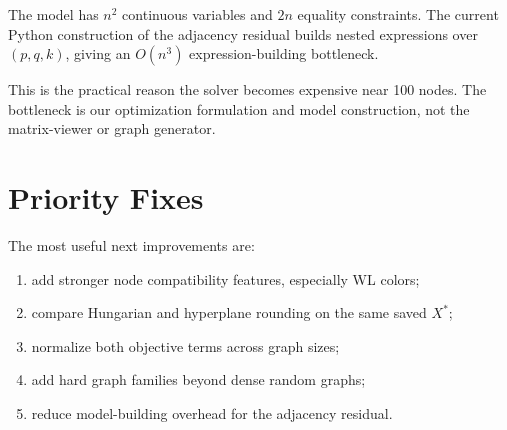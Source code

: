 \documentclass[11pt]{article}
\begin{document}
The model has $n^2$ continuous variables and $2n$ equality constraints.
The current Python construction of the adjacency residual builds nested
expressions over $(p,q,k)$, giving an $O(n^3)$ expression-building bottleneck.

This is the practical reason the solver becomes expensive near 100 nodes.
The bottleneck is our optimization formulation and model construction, not the
matrix-viewer or graph generator.

\section{Priority Fixes}

The most useful next improvements are:
\begin{enumerate}[leftmargin=*]
    \item add stronger node compatibility features, especially WL colors;
    \item compare Hungarian and hyperplane rounding on the same saved $X^*$;
    \item normalize both objective terms across graph sizes;
    \item add hard graph families beyond dense random graphs;
    \item reduce model-building overhead for the adjacency residual.
\end{enumerate}
\end{document}
